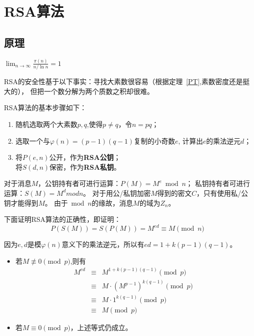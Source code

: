 \section{RSA算法}
\subsection{原理}
\begin{theorem}[素数定理]\label{PT}
    $\lim_{n\rightarrow\infty}\frac{\pi(n)}{n/\ln n}=1$
\end{theorem}
RSA的安全性基于以下事实：寻找大素数很容易（根据定理~\ref{PT},素数密度还是挺大的），
但把一个数分解为两个质数之积却很难。

RSA算法的基本步骤如下：
\begin{enumerate}
    \item 随机选取两个大素数$p,q$,使得$p\neq q$，令$n=pq$；
    \item 选取一个与$\varphi(n)=(p-1)(q-1)$复制的小奇数$e$,
    计算出$e$的乘法逆元$d$；
    \item 将$P(e,n)$公开，作为{\bfseries RSA公钥}；\\
          将$S(d,n)$保密，作为{\bfseries RSA私钥}。
\end{enumerate}

对于消息$M$，公钥持有者可进行运算：$P(M)=M^e \bmod n$；
私钥持有者可进行运算：$S(M)=M^d mod n$。
对于用公/私钥加密$M$得到的密文$C$，只有使用私/公钥才能得到$M$。
由于$\bmod n$的缘故，消息$M$的域为$Z_n$。

下面证明RSA算法的正确性，即证明：
\begin{displaymath}
    P(S(M))=S(P(M))=M^{ed}\equiv M \pmod{n}
\end{displaymath}

因为$e,d$是模$\varphi(n)$意义下的乘法逆元，所以有$ed=1+k(p-1)(q-1)$。

\begin{itemize}
    \item 若$M\not\equiv 0 \pmod{p}$,则有
    \begin{eqnarray*}
        M^{ed}&\equiv& M^{1+k(p-1)(q-1)} \pmod{p}\\
        &\equiv& M\cdot (M^{p-1})^{k(q-1)} \pmod{p}\\
        &\equiv& M\cdot 1^{k(q-1)} \pmod{p}\\
        &\equiv& M \pmod{p}
    \end{eqnarray*}
    \item 若$M\equiv 0 \pmod{p}$，上述等式仍成立。
\end{itemize}

